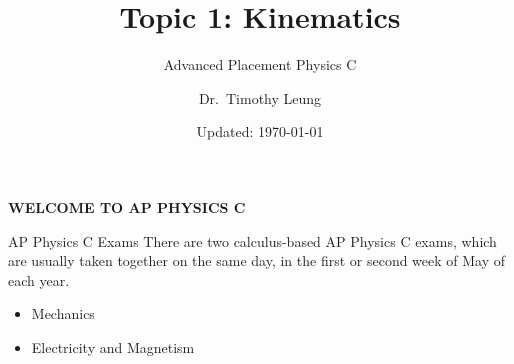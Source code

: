\documentclass[12pt,compress,aspectratio=169]{beamer}
\title{Topic 1: Kinematics}
\subtitle{Advanced Placement Physics C}
\author[TML]{Dr.\ Timothy Leung}
\institute{Olympiads School}
\date{Updated: \today}
\begin{document}
\begin{frame}{}

  {\LARGE
    \begin{center}
      \textbf{WELCOME TO AP PHYSICS C}
    \end{center}
  }
\end{frame}






\begin{frame}{AP Physics C Exams}
  There are two calculus-based AP Physics C exams, which are usually taken
  together on the same day, in the first or second week of May of each year.
  \begin{itemize}
  \item Mechanics
  \item Electricity and Magnetism
  \end{itemize}
\end{frame}



\begin{frame}
  \titlepage
\end{frame}
\end{document}
